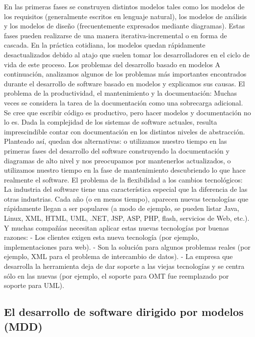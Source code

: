 En las primeras fases se construyen distintos modelos tales como los modelos de los requisitos (generalmente escritos en lenguaje natural), los modelos de análisis y los modelos de diseño (frecuentemente expresados mediante diagramas). Estas fases pueden realizarse de una manera iterativa-incremental o en forma de cascada. En la práctica cotidiana, los modelos quedan rápidamente desactualizados debido al atajo que suelen tomar los desarrolladores en el ciclo de vida de este proceso.
Los problemas del desarrollo basado en modelos 
A continuación, analizamos algunos de los problemas más importantes encontrados durante el desarrollo de software basado en modelos y explicamos sus causas.
El problema de la productividad, el mantenimiento y la documentación: Muchas veces se considera la tarea de la documentación como una sobrecarga adicional. Se cree que escribir código es productivo, pero hacer modelos y documentación no lo es. Dada la complejidad de los sistemas de software actuales, resulta imprescindible contar con documentación en los distintos niveles de abstracción. Planteado así, quedan dos alternativas: o utilizamos nuestro tiempo en las primeras fases del desarrollo del software construyendo la documentación y diagramas de alto nivel y nos preocupamos por mantenerlos actualizados, o utilizamos nuestro tiempo en la fase de mantenimiento descubriendo lo que hace realmente el software.
El problema de la flexibilidad a los cambios tecnológicos: La industria del software tiene una característica especial que la diferencia de las otras industrias. Cada año (o en menos tiempo), aparecen nuevas tecnologías que rápidamente llegan a ser populares (a modo de ejemplo, se pueden listar Java, Linux, XML, HTML, UML, .NET, JSP, ASP, PHP, flash, servicios de Web, etc.). Y muchas compañías necesitan aplicar estas nuevas tecnologías por buenas razones: - Los clientes exigen esta nueva tecnología (por ejemplo, implementaciones para web). - Son la solución para algunos problemas reales (por ejemplo, XML para el problema de intercambio de datos). - La empresa que desarrolla la herramienta deja de dar soporte a las viejas tecnologías y se centra sólo en las nuevas (por ejemplo, el soporte para OMT fue reemplazado por soporte para UML).




\subsection{El desarrollo de software dirigido por modelos (MDD)}

